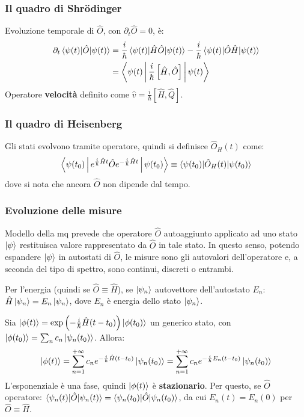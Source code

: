 \documentclass[10pt, a4paper]{scrartcl}
\numberwithin{equation}{subsection}
\theoremstyle{style1}
\begin{document}
\subsubsection{Il quadro di Shr\"odinger}
Evoluzione temporale di $\hat{O}$, con $\partial _t \hat{O}=0$, \`e: 
\begin{equation}
	\begin{split}
		\partial _t  \braket{\psi (t)|\hat{O}|\psi (t)} &= \frac{i}{\hbar }\braket{\psi (t)|\hat{H}\hat{O}|\psi (t)} - \frac{i}{\hbar }\braket{\psi (t)|\hat{O}\hat{H}|\psi (t)} \\
	&= \Braket{\psi (t)|\frac{i}{\hbar }\left[ \hat{H},\hat{O} \right] |\psi (t)} 
	\end{split}
\end{equation}
Operatore \textbf{velocit\`a} definito come $\hat{v}= \frac{i}{\hbar }\left[ \hat{H},\hat{Q} \right] $.

\subsubsection{Il quadro di Heisenberg}

Gli stati evolvono tramite operatore, quindi si definisce $\hat{O}_H (t)$ come:
\begin{equation}
	\Braket{\psi (t_0)|e^{\frac{i}{\hbar }\hat{H}t} \hat{O}e^{-\frac{i}{\hbar }\hat{H}t} |\psi (t_0)} \equiv \braket{\psi (t_0)|\hat{O}_H(t)|\psi (t_0)} 
\end{equation}
dove si nota che ancora $\hat{O}$ non dipende dal tempo.
\subsubsection{Evoluzione delle misure}

Modello della mq prevede che operatore $\hat{O}$ autoaggiunto applicato ad uno stato $\ket{\psi } $ restituisca valore rappresentato da $\hat{O}$ in tale stato. In questo senso, potendo espandere $\ket{\psi } $ in autostati di $\hat{O}$, le misure sono gli autovalori dell'operatore e, a seconda del tipo di spettro, sono continui, discreti o entrambi.

Per l'energia (quindi se $\hat{O}\equiv \hat{H}$), se $\ket{\psi _n} $ autovettore dell'autostato $E_n$: $\hat{H}\ket{\psi _n} = E_n \ket{\psi _n} $, dove $E_n$ \`e energia dello stato $\ket{\psi _n} $. 

Sia $\ket{\phi(t) }  = \exp\left(-\frac{i}{\hbar }\hat{H}(t-t_0)\right) \ket{\phi (t_0)} $ un generico stato, con $\ket{\phi (t_0)} =\sum_{n}^{} c_n \ket{\psi _n(t_0)} $. Allora:
\begin{equation}
	\ket{\phi (t)} = \sum_{n=1}^{+\infty} c_n e^{-\frac{i}{\hbar } \hat{H}(t-t_0)} \ket{\psi _n(t_0)} = \sum_{n=1}^{+\infty} c_n e^{-\frac{i}{\hbar }E_n (t-t_0)} \ket{\psi _n(t_0)}  
\end{equation}
L'esponenziale \`e una fase, quindi $\ket{\phi (t)} $ \`e \textbf{stazionario}. Per questo, se $\hat{O}$ operatore: $\braket{\psi _n(t)|\hat{O}|\psi _n(t)} = \braket{\psi _n(t_0)|\hat{O}|\psi _n(t_0)} $, da cui $E_n(t) = E_n(0)$ per $\hat{O}\equiv \hat{H}$.
\end{document}
